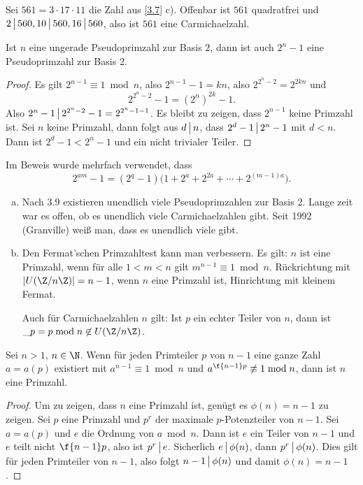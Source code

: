 \begin{ex*}
	Sei $561 = 3 \cdot 17 \cdot 11$ die Zahl aus \ref{3.7} c).
	Offenbar ist $561$ quadratfrei und $2 \divs 560, 10 \divs 560, 16 \divs 560$, also ist $561$ eine Carmichaelzahl.
\end{ex*}

\begin{lem} \label{2.9}
	Ist $n$ eine ungerade Pseudoprimzahl zur Basis $2$, dann ist auch $2^n - 1$ eine Pseudoprimzahl zur Basis $2$.
	\begin{proof}
		Es gilt $2^{n-1} \equiv 1 \bmod n$, also $2^{n-1} - 1 = kn$, also $2^{2^n-2} = 2^{2kn}$ und
		\[
			2^{2^n -2} - 1 = (2^n)^{2k} - 1.
		\]
		Also $2^n - 1 \divs 2^{2^n -2} - 1 = 2^{2^n - 1 - 1}$.
		Es bleibt zu zeigen, dass $2^{n-1}$ keine Primzahl ist.
		Sei $n$ keine Primzahl, dann folgt aus $d \divs n$, dass $2^d - 1 \divs 2^n - 1$ mit $d < n$.
		Dann ist $2^d - 1 < 2^n - 1$ und ein nicht trivialer Teiler.
	\end{proof}
	\begin{note}
		Im Beweis wurde mehrfach verwendet, dass
		\[
			2^{am} - 1
			= (2^q - 1)\Big(1 + 2^a + 2^{2a} + \dotsb + 2^{(m-1)a} \Big).
		\]
	\end{note}
\end{lem}

\begin{nt*}
	\begin{enumerate}[a)]
		\item
			Nach $3.9$ existieren unendlich viele Pseudoprimzahlen zur Basis 2.
			Lange zeit war es offen, ob es unendlich viele Carmichaelzahlen gibt.
			Seit 1992 (Granville) weiß man, dass es unendlich viele gibt.
		\item
			Den Fermat'schen Primzahltest kann man verbessern.
			Es gilt: $n$ ist eine Primzahl, wenn für alle $1 < m < n$ gilt $m^{n-1} \equiv 1 \bmod n$.
			Rückrichtung mit $| U(\Z/n\Z) | = n-1$, wenn $n$ eine Primzahl ist, Hinrichtung mit kleinem Fermat.

			Auch für Carmichaelzahlen $n$ gilt:
			Ist $p$ ein echter Teiler von $n$, dann ist $\_p = p \bmod n \not\in U(\Z / n\Z)$.
	\end{enumerate}
\end{nt*}

\begin{st}[Lucas] \label{3.10}
	Sei $n > 1$, $n \in \N$.
	Wenn für jeden Primteiler $p$ von $n - 1$ eine ganze Zahl $a = a(p)$ existiert mit $a^{n-1} \equiv 1 \bmod n$ und $a^{\f {n-1}p} \not \equiv 1 \bmod n$, dann ist $n$ eine Primzahl.

	\begin{proof}
		Um zu zeigen, dass $n$ eine Primzahl ist, genügt es $\phi(n) = n - 1$ zu zeigen.
		Sei $p$ eine Primzahl und $p^r$ der maximale $p$-Potenzteiler von $n-1$.
		Sei $a = a(p)$ und $e$ die Ordnung von $a \bmod n$.
		Dann ist $e$ ein Teiler von $n-1$ und $e$ teilt nicht $\f {n-1}p$, also ist $p^r \divs e$.
		Sicherlich $e \divs \phi(n)$, dann $p^r \divs \phi(n)$.
		Dies gilt für jeden Primteiler von $n-1$, also folgt $n - 1 \divs \phi(n)$ und damit $\phi(n) = n-1$.
	\end{proof}
\end{st}

